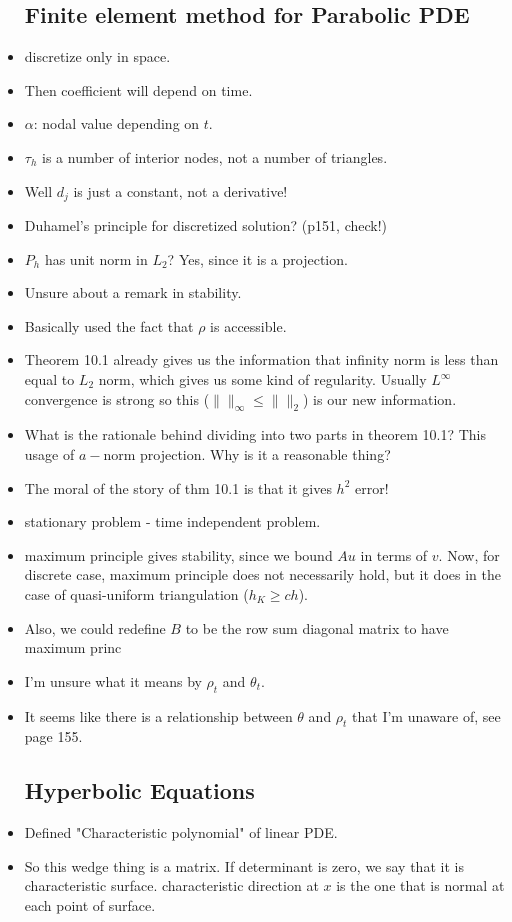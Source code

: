 \documentclass{article}
\theoremstyle{remark}
\begin{document}
\begin{itemize}
\subsection*{Finite element method for Parabolic PDE}
\item discretize only in space.
\item Then coefficient will depend on time.

\item $\alpha$: nodal value depending on $t$.
\item $\tau_h$ is a number of interior nodes, not a number of triangles.

\item Well $d_j$ is just a constant, not a derivative!
\item Duhamel's principle for discretized solution? (p151, check!)
\item $P_h$ has unit norm in $L_2$? Yes, since it is a projection.
\item Unsure about a remark in stability.
\item Basically used the fact that $\rho$ is accessible.
\item Theorem 10.1 already gives us the information that infinity norm is less than equal to $L_2$ norm, which gives us some kind of regularity. Usually $L^\infty$ convergence is strong so this ($\lVert\rVert_\infty\leq\lVert\rVert_2$) is our new information.
\item What is the rationale behind dividing into two parts in theorem 10.1? This usage of $a-$norm projection. Why is it a reasonable thing?
\item The moral of the story of thm 10.1 is that it gives $h^2$ error!
\item stationary problem - time independent problem.
\item maximum principle gives stability, since we bound $Au$ in terms of $v$. Now, for discrete case, maximum principle does not necessarily hold, but it does in the case of quasi-uniform triangulation ($h_K\geq ch$).
\item Also, we could redefine $B$ to be the row sum diagonal matrix to have maximum princ
\item I'm unsure what it means by $\rho_t$ and $\theta_t$.
\item It seems like there is a relationship between $\theta$ and $\rho_t$ that I'm unaware of, see page 155.


\subsection*{Hyperbolic Equations}
\item Defined "Characteristic polynomial" of linear PDE.
\item So this wedge thing is a matrix. If determinant is zero, we say that it is characteristic surface. characteristic direction at $x$ is the one that is normal at each point of surface.


\end{itemize}
\end{document}
